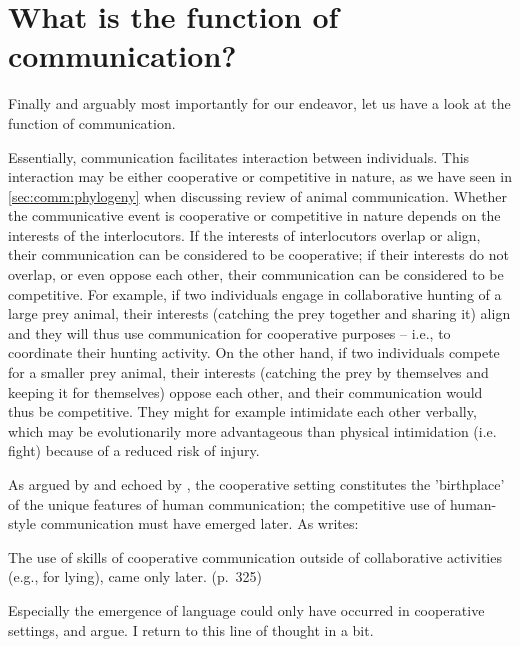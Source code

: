 \section{What is the function of communication?}
\label{sec:comm:function}

Finally and arguably most importantly for our endeavor, let us have a look at the function of communication.

Essentially, communication facilitates interaction between individuals.
This interaction may be either cooperative or competitive in nature, as we have seen in \cref{sec:comm:phylogeny} when discussing  review of animal communication.
Whether the communicative event is cooperative or competitive in nature depends on the interests of the interlocutors. If the interests of interlocutors overlap or align, their communication can be considered to be cooperative; if their interests do not overlap, or even oppose each other, their communication can be considered to be competitive.
For example, if two individuals engage in collaborative hunting of a large prey animal, their interests (catching the prey together and sharing it) align and they will thus use communication for cooperative purposes -- i.e., to coordinate their hunting activity. On the other hand, if two individuals compete for a smaller prey animal, their interests (catching the prey by themselves and keeping it for themselves) oppose each other, and their communication would thus be competitive. They might for example intimidate each other verbally, which may be evolutionarily more advantageous than physical intimidation (i.e. fight) because of a reduced risk of injury.

As argued by \citet{Tomasello08, Tomasello09} and echoed by \citet{Dor17}, the cooperative setting constitutes the 'birthplace' of the unique features of human communication; the competitive use of human-style communication must have emerged later. As \citet{Tomasello08} writes:
\begin{quoting}
    The use of skills of cooperative communication outside of collaborative activities (e.g., for lying), came only later.
    \hfill (p.~325)
\end{quoting}
Especially the emergence of language could only have occurred in cooperative settings, \citet{Tomasello08} and \citet{Dor17} argue. I return to this line of thought in a bit.

